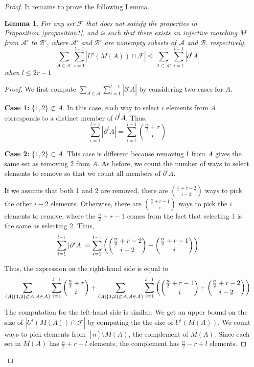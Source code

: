 \documentclass[12pt]{article}
\theoremstyle{plain}
\newtheorem{lemma}[theorem]{Lemma}
\theoremstyle{definition}
\theoremstyle{remark}
\newcommand{\F}{\mathcal{F}}
\newcommand{\A}{\mathcal{A}}
\newcommand{\B}{\mathcal{B}}
\begin{document}
\begin{proof}

It remains to prove the following Lemma.

\begin{lemma} For any set $\F$ that does not satisfy the properties in Proposition~\ref{proposition1}, and is such that there exists an injective matching $M$ from $\A'$ to $\B'$, where $\A'$ and $\B'$ are nonempty subsets of $\A$ and $\B$, respectively, 
\label{lemma1}
\[ \sum_{A\in \A'}\sum_{i = 1}^{l-1} |U^i(M(A)) \cap \F| \leq \sum_{A \in \A'}\sum_{i = 1}^{l-1} |\partial^i A | \]
when $l \leq 2r-1$
\end{lemma}

\begin{proof} We first compute $\sum_{A \in \A}\sum_{i = 1}^{l-1} |\partial^i A |$ by considering two cases for $A$.

\textbf{Case 1:} $\{1,2\} \not\subset A$. In this case, each way to select $i$ elements from $A$ corresponds to a distinct member of $\partial^i A$. Thus,
\[ \sum_{i=1}^{l-1} |\partial^i A| = \sum_{i=1}^{l-1}\binom{\frac{n}{2}+r}{i} \]

\textbf{Case 2:} $\{1,2\} \subset A$. This case is different because removing 1 from $A$ gives the same set as removing 2 from $A$. As before, we count the number of ways to select elements to remove so that we count all members of $\partial^i A$.

If we assume that both 1 and 2 are removed, there are $\binom{\frac{n}{2} + r - 2}{i-2}$ ways to pick the other $i-2$ elements. Otherwise, there are $\binom{\frac{n}{2}+r-1}{i}$ ways to pick the $i$ elements to remove, where the $\frac{n}{2} + r - 1$ comes from the fact that selecting 1 is the same as selecting 2. Thus, 
\[ \sum_{i=1}^{l-1} |\partial^i A| = \sum_{i=1}^{l-1} \left( \dbinom{\frac{n}{2}+r-2}{i-2} + \dbinom{\frac{n}{2} + r - 1}{i}\right)\]

Thus, the expression on the right-hand side is equal to
\[ \sum_{\{A | \{1, 2\} \not\subset A, A \in \A\}} \sum_{i=1}^{l-1} \dbinom{\frac{n}{2} + r}{i} + \sum_{\{A | \{1, 2\} \not\subset A, A \in \A\}} \sum_{i=1}^{l-1} \left( \dbinom{\frac{n}{2}+r-1}{i} + \dbinom{\frac{n}{2}+r-2}{i-2}\right) \]

The computation for the left-hand side is similar. We get an upper bound on the size of $|U^i(M(A)) \cap \F|$ by computing the the size of $U^i(M(A))$. We count ways to pick elements from $[n] \setminus M(A)$, the complement of $M(A)$. Since each set in $M(A)$ has $\frac{n}{2} + r - l$ elements, the complement has $\frac{n}{2} - r + l$ elements. 


\end{proof}
\end{proof}
\end{document}
